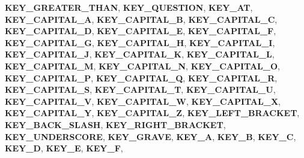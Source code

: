 \begin{DoxyCompactItemize}
\newline
{\bfseries K\+E\+Y\+\_\+\+G\+R\+E\+A\+T\+E\+R\+\_\+\+T\+H\+AN}, 
{\bfseries K\+E\+Y\+\_\+\+Q\+U\+E\+S\+T\+I\+ON}, 
{\bfseries K\+E\+Y\+\_\+\+AT}, 
{\bfseries K\+E\+Y\+\_\+\+C\+A\+P\+I\+T\+A\+L\+\_\+A}, 
\newline
{\bfseries K\+E\+Y\+\_\+\+C\+A\+P\+I\+T\+A\+L\+\_\+B}, 
{\bfseries K\+E\+Y\+\_\+\+C\+A\+P\+I\+T\+A\+L\+\_\+C}, 
{\bfseries K\+E\+Y\+\_\+\+C\+A\+P\+I\+T\+A\+L\+\_\+D}, 
{\bfseries K\+E\+Y\+\_\+\+C\+A\+P\+I\+T\+A\+L\+\_\+E}, 
\newline
{\bfseries K\+E\+Y\+\_\+\+C\+A\+P\+I\+T\+A\+L\+\_\+F}, 
{\bfseries K\+E\+Y\+\_\+\+C\+A\+P\+I\+T\+A\+L\+\_\+G}, 
{\bfseries K\+E\+Y\+\_\+\+C\+A\+P\+I\+T\+A\+L\+\_\+H}, 
{\bfseries K\+E\+Y\+\_\+\+C\+A\+P\+I\+T\+A\+L\+\_\+I}, 
\newline
{\bfseries K\+E\+Y\+\_\+\+C\+A\+P\+I\+T\+A\+L\+\_\+J}, 
{\bfseries K\+E\+Y\+\_\+\+C\+A\+P\+I\+T\+A\+L\+\_\+K}, 
{\bfseries K\+E\+Y\+\_\+\+C\+A\+P\+I\+T\+A\+L\+\_\+L}, 
{\bfseries K\+E\+Y\+\_\+\+C\+A\+P\+I\+T\+A\+L\+\_\+M}, 
\newline
{\bfseries K\+E\+Y\+\_\+\+C\+A\+P\+I\+T\+A\+L\+\_\+N}, 
{\bfseries K\+E\+Y\+\_\+\+C\+A\+P\+I\+T\+A\+L\+\_\+O}, 
{\bfseries K\+E\+Y\+\_\+\+C\+A\+P\+I\+T\+A\+L\+\_\+P}, 
{\bfseries K\+E\+Y\+\_\+\+C\+A\+P\+I\+T\+A\+L\+\_\+Q}, 
\newline
{\bfseries K\+E\+Y\+\_\+\+C\+A\+P\+I\+T\+A\+L\+\_\+R}, 
{\bfseries K\+E\+Y\+\_\+\+C\+A\+P\+I\+T\+A\+L\+\_\+S}, 
{\bfseries K\+E\+Y\+\_\+\+C\+A\+P\+I\+T\+A\+L\+\_\+T}, 
{\bfseries K\+E\+Y\+\_\+\+C\+A\+P\+I\+T\+A\+L\+\_\+U}, 
\newline
{\bfseries K\+E\+Y\+\_\+\+C\+A\+P\+I\+T\+A\+L\+\_\+V}, 
{\bfseries K\+E\+Y\+\_\+\+C\+A\+P\+I\+T\+A\+L\+\_\+W}, 
{\bfseries K\+E\+Y\+\_\+\+C\+A\+P\+I\+T\+A\+L\+\_\+X}, 
{\bfseries K\+E\+Y\+\_\+\+C\+A\+P\+I\+T\+A\+L\+\_\+Y}, 
\newline
{\bfseries K\+E\+Y\+\_\+\+C\+A\+P\+I\+T\+A\+L\+\_\+Z}, 
{\bfseries K\+E\+Y\+\_\+\+L\+E\+F\+T\+\_\+\+B\+R\+A\+C\+K\+ET}, 
{\bfseries K\+E\+Y\+\_\+\+B\+A\+C\+K\+\_\+\+S\+L\+A\+SH}, 
{\bfseries K\+E\+Y\+\_\+\+R\+I\+G\+H\+T\+\_\+\+B\+R\+A\+C\+K\+ET}, 
\newline
{\bfseries K\+E\+Y\+\_\+\+U\+N\+D\+E\+R\+S\+C\+O\+RE}, 
{\bfseries K\+E\+Y\+\_\+\+G\+R\+A\+VE}, 
{\bfseries K\+E\+Y\+\_\+A}, 
{\bfseries K\+E\+Y\+\_\+B}, 
\newline
{\bfseries K\+E\+Y\+\_\+C}, 
{\bfseries K\+E\+Y\+\_\+D}, 
{\bfseries K\+E\+Y\+\_\+E}, 
{\bfseries K\+E\+Y\+\_\+F}, 
\newline

\end{DoxyCompactItemize}
